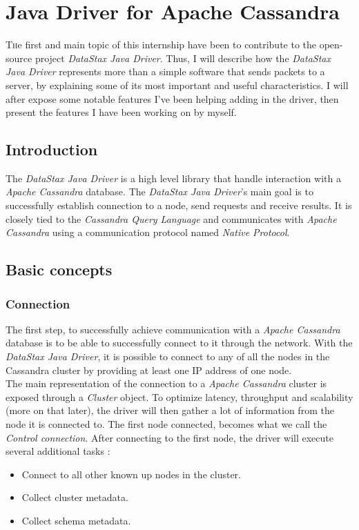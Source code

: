 \documentclass[a4paper]{report}
\newcommand{\djd}{\emph{DataStax Java Driver\xspace}}
\newcommand{\ca}{\emph{Apache Cassandra\xspace}}
\begin{document}

\chapter{Java Driver for Apache Cassandra}
\lettrine[nindent=0em,lines=3]{T} he first and main topic of this internship have been to contribute to the open-source project \djd{}. Thus, I will describe how the \djd{} represents more than a simple software that sends packets to a server, by explaining some of its most important and useful characteristics. I will after expose some notable features I've been helping adding in the driver, then present the features I have been working on by myself.
\section{Introduction}
The \djd{} is a high level library that handle interaction with a \ca{} database. The \djd{}'s main goal is to successfully establish connection to a node, send requests and receive results. It is closely tied to the \emph{Cassandra Query Language} and communicates with \ca{} using a communication protocol named \emph{Native Protocol}.

\section{Basic concepts}

\subsection{Connection}
The first step, to successfully achieve communication with a \ca{} database is to be able to successfully connect to it through the network. With the \djd{}, it is possible to connect to any of all the nodes in the Cassandra cluster by providing at least one IP address of one node.\\
The main representation of the connection to a \ca{} cluster is exposed through a \emph{Cluster} object. To optimize latency, throughput and scalability (more on that later), the driver will then gather a lot of information from the node it is connected to. The first node connected, becomes what we call the \emph{Control connection}. After connecting to the first node, the driver will execute several additional tasks :
\begin{itemize}
   \item Connect to all other known up nodes in the cluster.
   \item Collect cluster metadata.
   \item Collect schema metadata.
\end{itemize}
\end{document}
